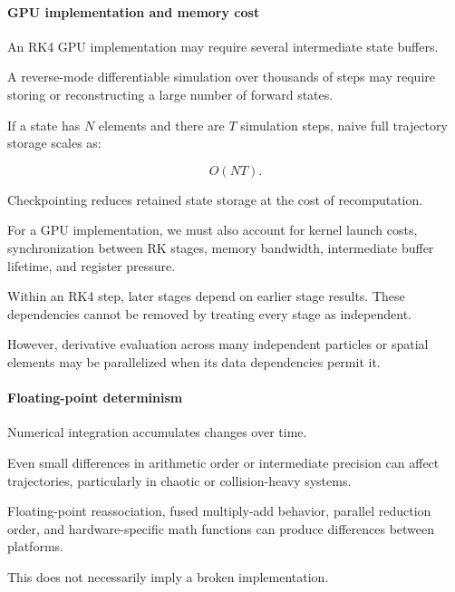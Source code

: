 \paragraph{GPU implementation and memory cost}\label{02-foundations-ii-ch022-gpu-implementation-and-memory-cost}

\hypertarget{02-foundations-ii-ch022-gpu-implementation-and-memory-cost}{}

An RK4 GPU implementation may require several intermediate state buffers.

A reverse-mode differentiable simulation over thousands of steps may require storing or reconstructing a large number of forward states.

If a state has \(N\) elements and there are \(T\) simulation steps, naive full trajectory storage scales as:

\[
O(NT).
\]

Checkpointing reduces retained state storage at the cost of recomputation.

For a GPU implementation, we must also account for kernel launch costs, synchronization between RK stages, memory bandwidth, intermediate buffer lifetime, and register pressure.

Within an RK4 step, later stages depend on earlier stage results. These dependencies cannot be removed by treating every stage as independent.

However, derivative evaluation across many independent particles or spatial elements may be parallelized when its data dependencies permit it.

\paragraph{Floating-point determinism}\label{02-foundations-ii-ch022-floating-point-determinism}

\hypertarget{02-foundations-ii-ch022-floating-point-determinism}{}

Numerical integration accumulates changes over time.

Even small differences in arithmetic order or intermediate precision can affect trajectories, particularly in chaotic or collision-heavy systems.

Floating-point reassociation, fused multiply-add behavior, parallel reduction order, and hardware-specific math functions can produce differences between platforms.

This does not necessarily imply a broken implementation.

